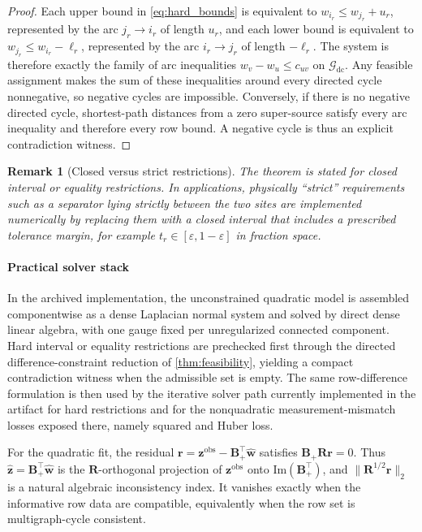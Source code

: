 \documentclass[preprint,12pt]{elsarticle}
\newtheorem{remark}{Remark}
\newcommand{\weights}{\mathbf{w}}
\newcommand{\graph}{\mathcal{G}}
\newcommand{\inc}{\mathbf{B}}
\begin{document}
\begin{proof}
Each upper bound in \eqref{eq:hard_bounds} is equivalent to
$w_{i_r}\le w_{j_r}+u_r$, represented by the arc $j_r\to i_r$ of length
$u_r$, and each lower bound is equivalent to
$w_{j_r}\le w_{i_r}-\ell_r$, represented by the arc $i_r\to j_r$ of length
$-\ell_r$. The system is therefore exactly the family of arc inequalities
$w_v-w_u\le c_{uv}$ on $\graph_{\mathrm{dc}}$. Any feasible assignment makes the
sum of these inequalities around every directed cycle nonnegative, so negative
cycles are impossible. Conversely, if there is no negative directed cycle,
shortest-path distances from a zero super-source satisfy every arc inequality
and therefore every row bound. A negative cycle is thus an explicit
contradiction witness.
\end{proof}

\begin{remark}[Closed versus strict restrictions]
\label{rem:strict}
The theorem is stated for closed interval or equality restrictions. In
applications, physically ``strict'' requirements such as a separator lying
strictly between the two sites are implemented numerically by replacing them
with a closed interval that includes a prescribed tolerance margin, for example
$t_r\in[\varepsilon,1-\varepsilon]$ in fraction space.
\end{remark}

\paragraph{Practical solver stack}
In the archived implementation, the unconstrained quadratic model is assembled
componentwise as a dense Laplacian normal system and solved by direct dense
linear algebra, with one gauge fixed per unregularized connected component.
Hard interval or equality restrictions are prechecked first through the
directed difference-constraint reduction of \cref{thm:feasibility}, yielding a
compact contradiction witness when the admissible set is empty. The same
row-difference formulation is then used by the iterative solver path currently
implemented in the artifact for hard restrictions and for the nonquadratic
measurement-mismatch losses exposed there, namely squared and Huber loss.

For the quadratic fit, the residual
$\mathbf{r}=\mathbf{z}^{\mathrm{obs}}-\inc_+^\top\widehat{\weights}$ satisfies
$\inc_+ \mathbf{R}\mathbf{r}=0$. Thus
$\widehat{\mathbf{z}}=\inc_+^\top\widehat{\weights}$ is the
$\mathbf{R}$-orthogonal projection of $\mathbf{z}^{\mathrm{obs}}$ onto
$\mathrm{Im}(\inc_+^\top)$, and
$\|\mathbf{R}^{1/2}\mathbf{r}\|_2$ is a natural algebraic inconsistency index.
It vanishes exactly when the informative row data are compatible, equivalently
when the row set is multigraph-cycle consistent.
\end{document}
